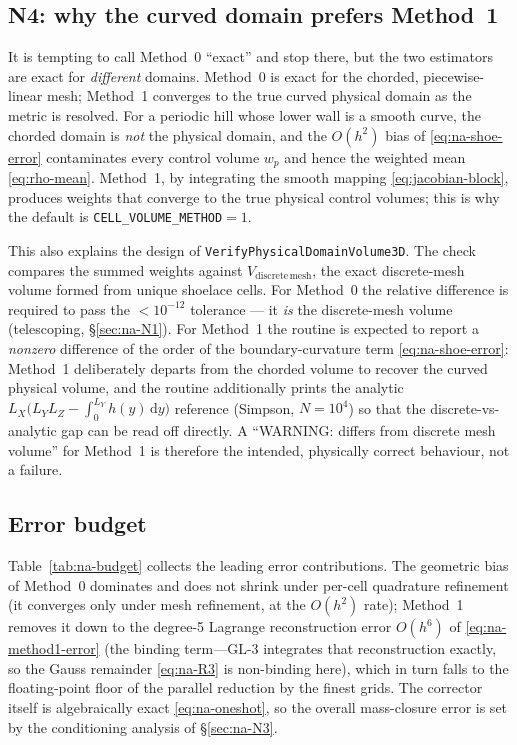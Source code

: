 \documentclass[11pt]{article}
\theoremstyle{definition}
\theoremstyle{remark}
\begin{document}
\subsection{N4: why the curved domain prefers Method~1}
\label{sec:na-N4}

It is tempting to call Method~0 ``exact'' and stop there, but the two estimators
are exact for \emph{different} domains. Method~0 is exact for the chorded,
piecewise-linear mesh; Method~1 converges to the true curved physical domain as
the metric is resolved. For a periodic hill whose lower wall is a smooth curve,
the chorded domain is \emph{not} the physical domain, and the $O(h^2)$ bias of
\eqref{eq:na-shoe-error} contaminates every control volume $w_p$ and hence the
weighted mean \eqref{eq:rho-mean}. Method~1, by integrating the smooth mapping
\eqref{eq:jacobian-block}, produces weights that converge to the true physical
control volumes; this is why the default is \texttt{CELL\_VOLUME\_METHOD}${=}1$.

This also explains the design of \texttt{VerifyPhysicalDomainVolume3D}. The check
compares the summed weights against $V_{\mathrm{discrete\,mesh}}$, the exact
discrete-mesh volume formed from unique shoelace cells. For Method~0 the relative
difference is required to pass the $<10^{-12}$ tolerance --- it \emph{is} the
discrete-mesh volume (telescoping, \S\ref{sec:na-N1}). For Method~1 the routine is
expected to report a \emph{nonzero} difference of the order of the
boundary-curvature term \eqref{eq:na-shoe-error}: Method~1 deliberately departs
from the chorded volume to recover the curved physical volume, and the routine
additionally prints the analytic
$L_X\bigl(L_Y L_Z - \int_0^{L_Y} h(y)\,\mathrm{d}y\bigr)$ reference (Simpson,
$N{=}10^4$) so that the discrete-vs-analytic gap can be read off directly. A
``WARNING: differs from discrete mesh volume'' for Method~1 is therefore the
intended, physically correct behaviour, not a failure.

\subsection{Error budget}
\label{sec:na-budget}

Table~\ref{tab:na-budget} collects the leading error contributions. The geometric
bias of Method~0 dominates and does not shrink under per-cell quadrature refinement
(it converges only under mesh refinement, at the $O(h^2)$ rate); Method~1 removes it
down to the degree-5 Lagrange reconstruction error $O(h^6)$ of
\eqref{eq:na-method1-error} (the binding term---GL-3 integrates that reconstruction
exactly, so the Gauss remainder \eqref{eq:na-R3} is non-binding here), which in turn
falls to the floating-point floor of the parallel reduction by the finest grids. The
corrector itself is algebraically exact \eqref{eq:na-oneshot}, so the overall
mass-closure error is set by the conditioning analysis of \S\ref{sec:na-N3}.
\end{document}
